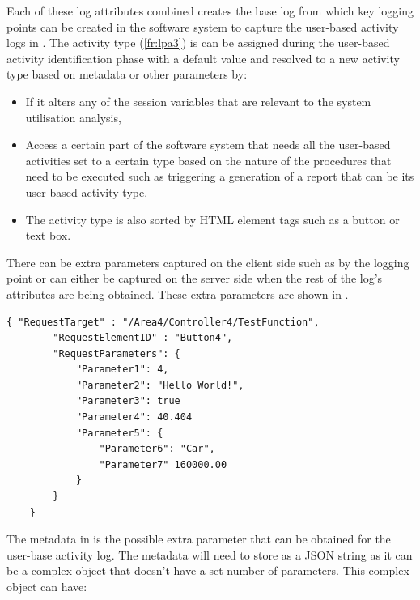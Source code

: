 \clearpage

Each of these log attributes combined creates the base log from which key logging points can be created in the software system to capture the user-based activity logs in . The activity type (\ref{fr:lpa3}) is can be assigned during the user-based activity identification phase with a default value and resolved to a new activity type based on metadata or other parameters by:

\begin{itemize}
	\item If it alters any of the session variables that are relevant to the system utilisation analysis,
	\item Access a certain part of the software system that needs all the user-based activities set to a certain type based on the nature of the procedures that need to be executed such as triggering a generation of a report that can be its user-based activity type.
	\item The activity type is also sorted by HTML element tags such as a button or text box.
\end{itemize}

There can be extra parameters captured on the client side such as by the logging point or can either be captured on the server side when the rest of the log's attributes are being obtained. These extra parameters are shown in .

\begin{lstlisting}[style=json, caption={\textit{Metadata JSON}}, label={fig:ch2_MetadataJsonExample}] 
	{ "RequestTarget" : "/Area4/Controller4/TestFunction",
		"RequestElementID" : "Button4",
		"RequestParameters": {
			"Parameter1": 4,
			"Parameter2": "Hello World!",
			"Parameter3": true
			"Parameter4": 40.404
			"Parameter5": {
				"Parameter6": "Car",
				"Parameter7" 160000.00
			}
		}		
	}
\end{lstlisting}

The metadata in  is the possible extra parameter that can be obtained for the user-base activity log. The metadata will need to store as a JSON string as it can be a complex object that doesn't have a set number of parameters. This complex object can have:

